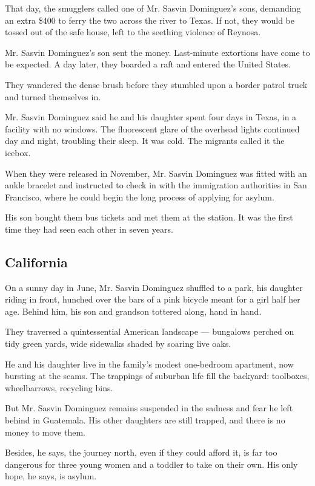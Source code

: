 That day, the smugglers called one of Mr. Sasvin Dominguez's sons,
demanding an extra \$400 to ferry the two across the river to Texas. If
not, they would be tossed out of the safe house, left to the seething
violence of Reynosa.

Mr. Sasvin Dominguez's son sent the money. Last-minute extortions have
come to be expected. A day later, they boarded a raft and entered the
United States.

They wandered the dense brush before they stumbled upon a border patrol
truck and turned themselves in.

Mr. Sasvin Dominguez said he and his daughter spent four days in Texas,
in a facility with no windows. The fluorescent glare of the overhead
lights continued day and night, troubling their sleep. It was cold. The
migrants called it the icebox.

When they were released in November, Mr. Sasvin Dominguez was fitted
with an ankle bracelet and instructed to check in with the immigration
authorities in San Francisco, where he could begin the long process of
applying for asylum.

His son bought them bus tickets and met them at the station. It was the
first time they had seen each other in seven years.

\hypertarget{california}{%
\subsection{California}\label{california}}

On a sunny day in June, Mr. Sasvin Dominguez shuffled to a park, his
daughter riding in front, hunched over the bars of a pink bicycle meant
for a girl half her age. Behind him, his son and grandson tottered
along, hand in hand.

They traversed a quintessential American landscape --- bungalows perched
on tidy green yards, wide sidewalks shaded by soaring live oaks.

He and his daughter live in the family's modest one-bedroom apartment,
now bursting at the seams. The trappings of suburban life fill the
backyard: toolboxes, wheelbarrows, recycling bins.

But Mr. Sasvin Dominguez remains suspended in the sadness and fear he
left behind in Guatemala. His other daughters are still trapped, and
there is no money to move them.

Besides, he says, the journey north, even if they could afford it, is
far too dangerous for three young women and a toddler to take on their
own. His only hope, he says, is asylum.


